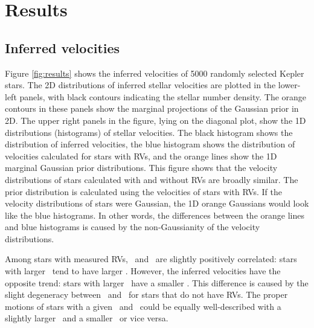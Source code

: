 \section{Results}
\label{sec:results}

\subsection{Inferred velocities}

Figure \ref{fig:results} shows the inferred velocities of 5000 randomly
selected Kepler stars.
The 2D distributions of inferred stellar velocities are plotted in the
lower-left panels, with black contours indicating the stellar number density.
The orange contours in these panels show the marginal projections of the
Gaussian prior in 2D.
The upper right panels in the figure, lying on the diagonal plot, show the 1D
distributions (histograms) of stellar velocities.
The black histogram shows the distribution of inferred velocities, the blue
histogram shows the distribution of velocities calculated for stars with RVs,
and the orange lines show the 1D marginal Gaussian prior distributions.
This figure shows that the velocity distributions of stars calculated with and
without RVs are broadly similar.
The prior distribution is calculated using the velocities of stars with RVs.
If the velocity distributions of stars were Gaussian, the 1D orange Gaussians
would look like the blue histograms.
In other words, the differences between the orange lines and blue histograms
is caused by the non-Gaussianity of the velocity distributions.

Among stars with measured RVs, \vy\ and \vz\ are slightly positively
correlated: stars with larger \vy\ tend to have larger \vz.
However, the inferred velocities have the opposite trend: stars with larger
\vy\ have a smaller \vz.
This difference is caused by the slight degeneracy between \vy\ and \vz\ for
stars that do not have RVs.
The proper motions of stars with a given \vy\ and \vz\ could be equally
well-described with a slightly larger \vy\ and a smaller \vz\ or vice versa.

